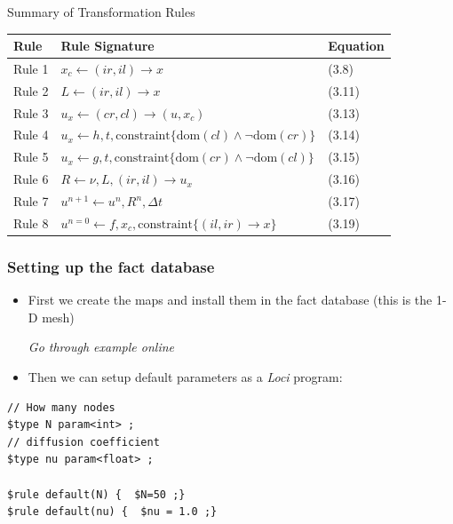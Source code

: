 \documentclass{beamer}
\begin{document}
\begin{frame}{Summary of Transformation Rules}
\begin{center}
  \begin{tabular}{|l|l|l|}
    \hline
    Rule  & Rule Signature & Equation\\
    \hline
    Rule 1 & $x_c \leftarrow (ir,il)\rightarrow x $ &    (3.8)\\
    Rule 2 & $ L \leftarrow (ir,il)\rightarrow x $ &    (3.11)\\
    Rule 3 & $u_x \leftarrow (cr,cl)\rightarrow(u,x_c)$ &    (3.13)\\
    Rule 4 & $u_x \leftarrow  h, t, \mbox{constraint}\lbrace 
    \mathrm{dom}(cl) \wedge \neg \mathrm{dom}(cr) \rbrace$ &    (3.14)\\
    Rule 5 & $u_x \leftarrow  g, t, \mbox{constraint}\lbrace 
    \mathrm{dom}(cr) \wedge \neg \mathrm{dom}(cl) \rbrace$ &    (3.15)\\
    Rule 6 & $R\leftarrow \nu,L,(ir,il)\rightarrow u_x$ & (3.16)\\
    Rule 7 & $u^{n+1} \leftarrow u^n, R^n, \Delta t$ & (3.17)\\
    Rule 8 & $u^{n=0} \leftarrow f,x_c,\mbox{constraint}\lbrace(il,ir)\rightarrow
    x\rbrace $ &    (3.19)\\
    \hline
  \end{tabular}
\end{center}
\end{frame}
\begin{frame}[fragile=singleslide]\frametitle{Setting up the fact database}
\begin{itemize}
\item First we create the maps and install them in the fact database (this is the 1-D mesh)

  {\it Go through example online}
\item Then we can setup default parameters as a {\it Loci} program:
\end{itemize}
\begin{verbatim}
// How many nodes
$type N param<int> ;              
// diffusion coefficient
$type nu param<float> ;           

$rule default(N) {  $N=50 ;}
$rule default(nu) {  $nu = 1.0 ;}
\end{verbatim}
\end{frame}
\end{document}
